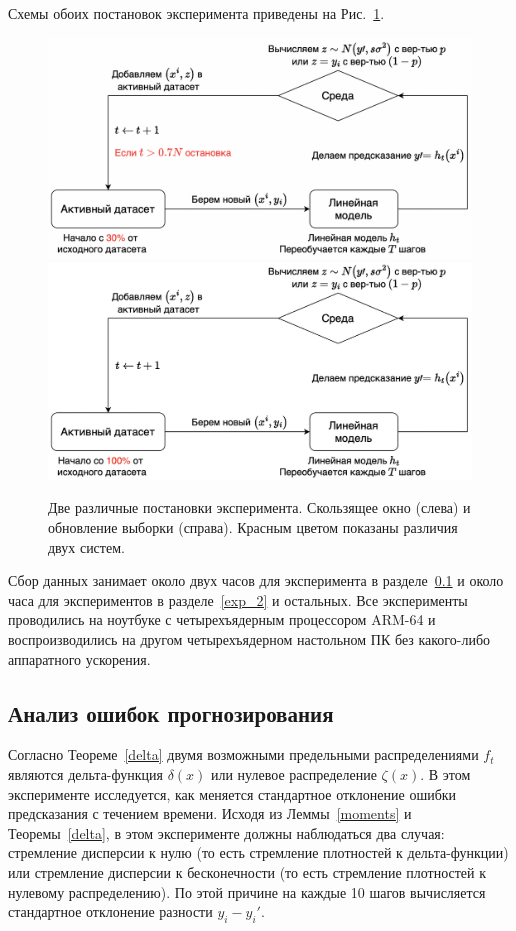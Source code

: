     Схемы обоих постановок эксперимента приведены на Рис.~\ref{ex_set}. 

    \begin{figure}[h!]
        \centering
        \includegraphics[width=0.49\linewidth]{pictures/Sliding window.png}
        \includegraphics[width=0.49\linewidth]{pictures/Sampling update.png}
        
        \caption{Две различные постановки эксперимента. Скользящее окно (слева) и обновление выборки (справа). Красным цветом показаны различия двух систем.}
        \label{ex_set}
    \end{figure}

    Сбор данных занимает около двух часов для эксперимента в разделе~\ref{exp_1} и около часа для экспериментов в разделе~\ref{exp_2} и остальных. Все эксперименты проводились на ноутбуке с четырехъядерным процессором ARM-64 и воспроизводились на другом четырехъядерном настольном ПК без какого-либо аппаратного ускорения.

\subsection{Анализ ошибок прогнозирования} \label{exp_1}

    Согласно Теореме~\ref{delta} двумя возможными предельными распределениями $f_t$ являются дельта-функция $\delta(x)$ или нулевое распределение $\zeta(x)$. В этом эксперименте исследуется, как меняется стандартное отклонение ошибки предсказания с течением времени. Исходя из Леммы~\ref{moments} и Теоремы~\ref{delta}, в этом эксперименте должны наблюдаться два случая: стремление дисперсии к нулю (то есть стремление плотностей к дельта-функции) или стремление дисперсии к бесконечности (то есть стремление плотностей к нулевому распределению). По этой причине на каждые 10 шагов вычисляется стандартное отклонение разности $y_i - y_i'$. 

